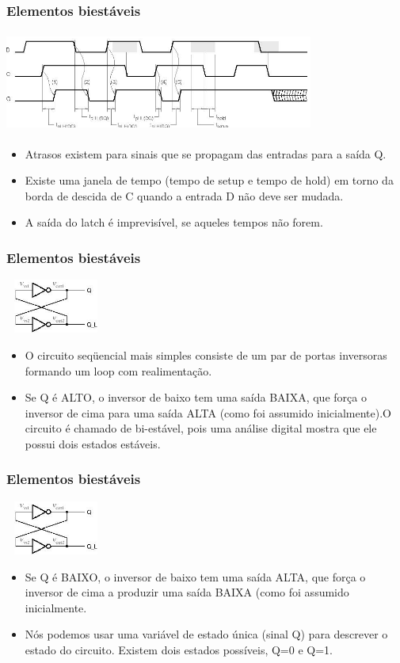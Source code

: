 \documentclass{beamer}
\begin{document}
\begin{frame}
 \frametitle{Elementos biestáveis}
 \includegraphics[height = 1.3in, width = 4in]{slide12_filomeno} 
 \begin{itemize}
  \item Atrasos existem para sinais que se propagam das entradas para a saída Q.\pause
  \item Existe uma janela de tempo (tempo de setup e tempo de hold) em torno da borda de descida de C quando a entrada D não deve ser mudada.\pause
  \item A saída do latch é imprevisível, se aqueles tempos não forem.
 \end{itemize}
\end{frame}

\begin{frame}
 \frametitle{Elementos biestáveis}
 \begin{center}
  \includegraphics[height = 0.7in, width = 1.3in]{slide13_filomeno} 
 \end{center}
 \begin{itemize}
  \item O circuito seqüencial mais simples consiste de um par de portas inversoras formando um loop com realimentação.\pause
  \item Se Q é ALTO, o inversor de baixo tem uma saída BAIXA, que força o inversor de cima para uma saída ALTA (como foi assumido inicialmente).O circuito é chamado 
	de bi-estável, pois uma análise digital mostra que ele possui dois estados estáveis.
 \end{itemize}
\end{frame}

\begin{frame}
 \frametitle{Elementos biestáveis}
 \begin{center}
  \includegraphics[height = 0.7in, width = 1.3in]{slide13_filomeno} 
 \end{center}
 \begin{itemize}
  \item Se Q é BAIXO, o inversor de baixo tem uma saída ALTA, que força o inversor de cima a produzir uma saída BAIXA (como foi assumido inicialmente. \pause
  \item Nós podemos usar uma variável de estado única (sinal Q) para descrever o estado do circuito. Existem dois estados possíveis, Q=0 e Q=1.
 \end{itemize}
\end{frame}
\end{document}
